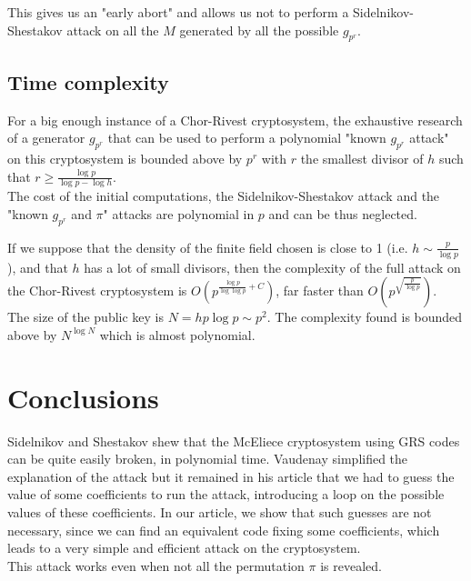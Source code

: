 \documentclass[a4paper]{article}
\begin{document}
This gives us an "early abort" and allows us not to perform a Sidelnikov-Shestakov attack on all the $M$ generated by all the possible $g_{p^r}$.

\subsection{Time complexity}

For a big enough instance of a Chor-Rivest cryptosystem, the exhaustive research of a generator $g_{p^r}$ that can be used to perform a polynomial "known $g_{p^r}$ attack" on this cryptosystem is bounded above by $p^r$ with $r$ the smallest divisor of $h$ such that $r \geq \frac{\log p}{\log p - \log h}$.\\

The cost of the initial computations, the Sidelnikov-Shestakov attack and the "known $g_{p^r}$ and $\pi$" attacks are polynomial in $p$ and can be thus neglected.

If we suppose that the density of the finite field chosen is close to 1 (i.e. $h \sim \frac{p}{\log p}$), and that $h$ has a lot of small divisors, then the complexity of the full attack on the Chor-Rivest cryptosystem is $O\left( p^{\frac{\log p}{\log \log p} + C} \right)$, far faster than $O\left(p^{\sqrt{\frac{p}{\log p}}}\right)$.\\

The size of the public key is $N = hp\log p \sim p^2$. The complexity found is bounded above by $N^{\log N}$ which is almost polynomial.





\section{Conclusions}

Sidelnikov and Shestakov shew that the McEliece cryptosystem using GRS codes can be quite easily broken, in polynomial time.
Vaudenay simplified the explanation of the attack but it remained in his article that we had to guess the value of some coefficients to run the attack, introducing a loop on the possible values of these coefficients.
In our article, we show that such guesses are not necessary, since we can find an equivalent code fixing some coefficients, which leads to a very simple and efficient attack on the cryptosystem.\\



This attack works even when not all the permutation $\pi$ is revealed.
\end{document}
